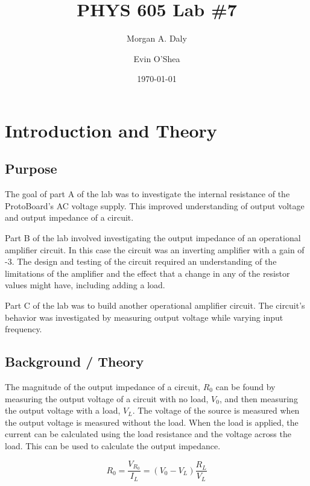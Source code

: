 \documentclass[twocolumn, amsmath]{revtex4}
\begin{document}
\title{PHYS 605 Lab \#7} 

\author{Morgan A. Daly}
\author{Evin O'Shea}
\date{\today} 


\maketitle


\section{Introduction and Theory}
\subsection{Purpose}

The goal of part A of the lab was to investigate the internal resistance of the ProtoBoard's AC voltage supply. This improved understanding of output voltage and output impedance of a circuit. 

Part B of the lab involved investigating the output impedance of an operational amplifier circuit. In this case the circuit was an inverting amplifier with a gain of -3. The design and testing of the circuit required an understanding of the limitations of the amplifier and the effect that a change in any of the resistor values might have, including adding a load.

Part C of the lab was to build another operational amplifier circuit. The circuit's behavior was investigated by measuring output voltage while varying input frequency. 

\subsection{Background / Theory}

The magnitude of the output impedance of a circuit, $R_0$ can be found by measuring the output voltage of a circuit with no load, $V_0$, and then measuring the output voltage with a load, $V_L$. 
The voltage of the source is measured when the output voltage is measured without the load. 
When the load is applied, the current can be calculated using the load resistance and the voltage across the load. This can be  used to calculate the output impedance.

\begin{equation}
R_{0} =  \frac{V_{R_{0}}}{I_{L}} = (V_{0} - V_{L})\frac{R_{L}}{V_{L}}
\end{equation}
\end{document}
